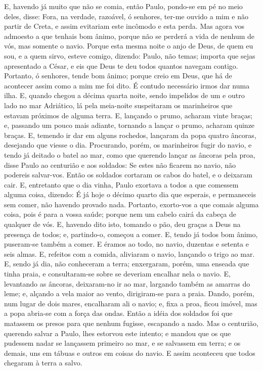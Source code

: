 E, havendo já muito que não se comia, então Paulo, pondo-se em pé
no meio deles, disse: Fora, na verdade, razoável, ó senhores, ter-me
ouvido a mim e não partir de Creta, e assim evitariam este incômodo
e esta perda. Mas agora vos admoesto a que tenhais bom ânimo,
porque não se perderá a vida de nenhum de vós, mas somente o navio.
Porque esta mesma noite o anjo de Deus, de quem eu sou, e a
quem sirvo, esteve comigo, dizendo: Paulo, não temas; importa
que sejas apresentado a César, e eis que Deus te deu todos quantos
navegam contigo. Portanto, ó senhores, tende bom ânimo;
porque creio em Deus, que há de acontecer assim como a mim me foi
dito. É contudo necessário irmos dar numa ilha. E,
quando chegou a décima quarta noite, sendo impelidos de um e outro
lado no mar Adriático, lá pela meia-noite suspeitaram os marinheiros
que estavam próximos de alguma terra. E, lançando o prumo,
acharam vinte braças; e, passando um pouco mais adiante, tornando a
lançar o prumo, acharam quinze braças. E, temendo ir dar em
alguns rochedos, lançaram da popa quatro âncoras, desejando que
viesse o dia. Procurando, porém, os marinheiros fugir do
navio, e tendo já deitado o batel ao mar, como que querendo lançar
as âncoras pela proa, disse Paulo ao centurião e aos
soldados: Se estes não ficarem no navio, não podereis salvar-vos.
Então os soldados cortaram os cabos do batel, e o deixaram
cair. E, entretanto que o dia vinha, Paulo exortava a todos a
que comessem alguma coisa, dizendo: É já hoje o décimo quarto dia
que esperais, e permaneceis sem comer, não havendo provado nada.
Portanto, exorto-vos a que comais alguma coisa, pois é para a
vossa saúde; porque nem um cabelo cairá da cabeça de qualquer de
vós. E, havendo dito isto, tomando o pão, deu graças a Deus
na presença de todos; e, partindo-o, começou a comer. E,
tendo já todos bom ânimo, puseram-se também a comer. E éramos
ao todo, no navio, duzentas e setenta e seis almas. E,
refeitos com a comida, aliviaram o navio, lançando o trigo ao mar.
E, sendo já dia, não conheceram a terra; enxergaram, porém,
uma enseada que tinha praia, e consultaram-se sobre se deveriam
encalhar nela o navio. E, levantando as âncoras, deixaram-no
ir ao mar, largando também as amarras do leme; e, alçando a vela
maior ao vento, dirigiram-se para a praia. Dando, porém, num
lugar de dois mares, encalharam ali o navio; e, fixa a proa, ficou
imóvel, mas a popa abria-se com a força das ondas. Então a
idéia dos soldados foi que matassem os presos para que nenhum
fugisse, escapando a nado. Mas o centurião, querendo salvar a
Paulo, lhes estorvou este intento; e mandou que os que pudessem
nadar se lançassem primeiro ao mar, e se salvassem em terra;
e os demais, uns em tábuas e outros em coisas do navio. E
assim aconteceu que todos chegaram à terra a salvo.

